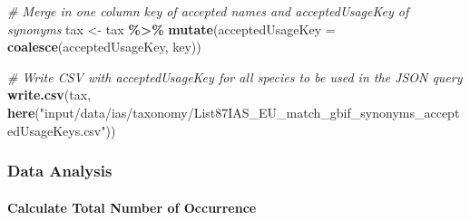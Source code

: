 \documentclass[
]{article}
\newenvironment{Shaded}{\begin{snugshade}}{\end{snugshade}}
\newcommand{\AttributeTok}[1]{\textcolor[rgb]{0.13,0.29,0.53}{#1}}
\newcommand{\CommentTok}[1]{\textcolor[rgb]{0.56,0.35,0.01}{\textit{#1}}}
\newcommand{\FunctionTok}[1]{\textcolor[rgb]{0.13,0.29,0.53}{\textbf{#1}}}
\newcommand{\NormalTok}[1]{#1}
\newcommand{\OtherTok}[1]{\textcolor[rgb]{0.56,0.35,0.01}{#1}}
\newcommand{\SpecialCharTok}[1]{\textcolor[rgb]{0.81,0.36,0.00}{\textbf{#1}}}
\newcommand{\StringTok}[1]{\textcolor[rgb]{0.31,0.60,0.02}{#1}}
\begin{document}
\begin{Shaded}
\begin{Highlighting}[]
\CommentTok{\# Merge in one column \textasciigrave{}key\textasciigrave{} of accepted names and \textasciigrave{}acceptedUsageKey\textasciigrave{} of synonyms}
\NormalTok{tax }\OtherTok{\textless{}{-}}\NormalTok{ tax }\SpecialCharTok{\%\textgreater{}\%}
  \FunctionTok{mutate}\NormalTok{(}\AttributeTok{acceptedUsageKey =} \FunctionTok{coalesce}\NormalTok{(acceptedUsageKey, key))}

\CommentTok{\# Write CSV with \textasciigrave{}acceptedUsageKey\textasciigrave{} for all species to be used in the JSON query}
\FunctionTok{write.csv}\NormalTok{(tax, }\FunctionTok{here}\NormalTok{(}\StringTok{"input/data/ias/taxonomy/List87IAS\_EU\_match\_gbif\_synonyms\_acceptedUsageKeys.csv"}\NormalTok{))}
\end{Highlighting}
\end{Shaded}

\subsubsection{Data Analysis}\label{data-analysis}

\paragraph{Calculate Total Number of
Occurrence}\label{calculate-total-number-of-occurrence}

\begin{Shaded}
\end{Shaded}
\end{document}
